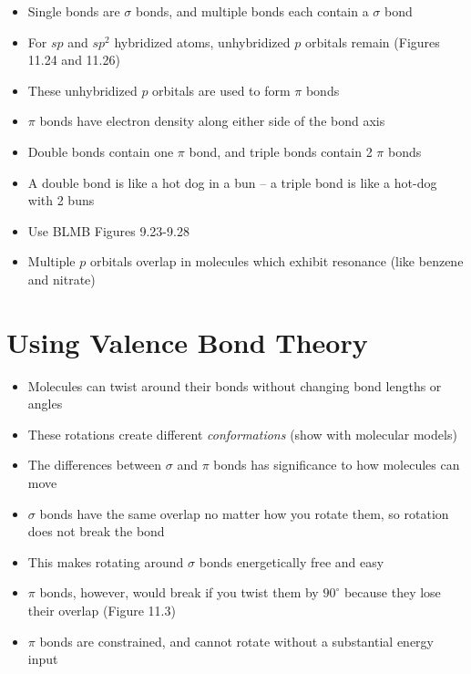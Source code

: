 \documentclass[12pt, openany, letterpaper]{memoir}
\begin{document}
\begin{itemize}
\begin{itemize}
		      \item Single bonds are $\sigma$ bonds, and multiple bonds each contain a $\sigma$ bond
		      \item For $sp$ and $sp^2$ hybridized atoms, unhybridized $p$ orbitals remain (Figures 11.24 and 11.26)
		      \item These unhybridized $p$ orbitals are used to form $\pi$ bonds
		      \item $\pi$ bonds have electron density along either side of the bond axis
		      \item Double bonds contain one $\pi$ bond, and triple bonds contain 2 $\pi$ bonds
		      \item A double bond is like a hot dog in a bun -- a triple bond is like a hot-dog with 2 buns
		      \item Use BLMB Figures 9.23-9.28
		      \item Multiple $p$ orbitals overlap in molecules which exhibit resonance (like benzene and nitrate)
	      \end{itemize}
\end{itemize}
\section{Using Valence Bond Theory}
\begin{itemize}
	\item Molecules can twist around their bonds without changing bond lengths or angles
	\item These rotations create different \emph{conformations} (show with molecular models)
	\item The differences between $\sigma$ and $\pi$ bonds has significance to how molecules can move
	\item $\sigma$ bonds have the same overlap no matter how you rotate them, so rotation does not break the bond
	\item This makes rotating around $\sigma$ bonds energetically free and easy
	\item $\pi$ bonds, however, would break if you twist them by $90^\circ$ because they lose their overlap (Figure 11.3)
	\item $\pi$ bonds are constrained, and cannot rotate without a substantial energy input
\end{itemize}
\end{document}
